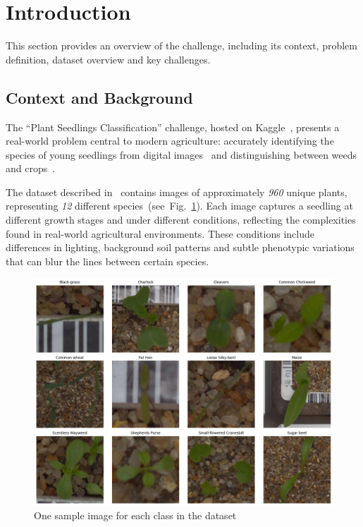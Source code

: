 \section{Introduction}

This section provides an overview of the challenge, including its context, problem definition, dataset overview and key challenges.

\subsection{Context and Background}
The ``Plant Seedlings Classification'' challenge, hosted on Kaggle~\cite{plant-seedlings-classification}, presents a real-world problem central to modern agriculture: accurately identifying the species of young seedlings from digital images~\cite{MESHRAM2021100010} and distinguishing between weeds and crops~\cite{9317797}.

The dataset described in~\cite{DBLP:journals/corr/abs-1711-05458} contains images of approximately \textit{960} unique plants, representing \textit{12} different species~(see~Fig.~\ref{fig:sample-images}). Each image captures a seedling at different growth stages and under different conditions, reflecting the complexities found in real-world agricultural environments. These conditions include differences in lighting, background soil patterns and subtle phenotypic variations that can blur the lines between certain species.

\begin{figure}[htbp]
    \centerline{\includegraphics[width=0.9\linewidth]{../../resources/sample_images.png}}
    \caption{One sample image for each class in the dataset}
    \label{fig:sample-images}
\end{figure}

